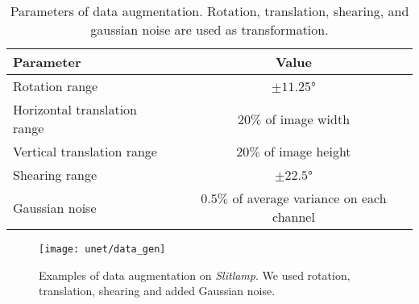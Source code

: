 \begin{table}[!htbp]
   \centering
   \caption[Data augmentation parameters]{Parameters of data augmentation. Rotation, translation, shearing, and gaussian noise are used as transformation.}
   \begin{tabular}{l|c}
      \toprule
      \textbf{Parameter} & \textbf{Value} \\
      \midrule
      Rotation range & $\pm11.25$° \\
      \midrule
      Horizontal translation range & $20\%$ of image width \\
      \midrule
      Vertical translation range & $20\%$ of image height \\
      \midrule
      Shearing range & $\pm22.5$° \\
      \midrule
     Gaussian noise & $0.5\%$ of average variance on each channel\\
      \bottomrule
   \end{tabular}
   \label{tab:data_gen_param}
\end{table}
\vspace{30pt}

\begin{figure}[!htbp]
  \centering
  \texttt{[image: unet/data\_gen]}
  \caption[Examples of data generator]{Examples of data augmentation on \textit{Slitlamp}. We used rotation, translation, shearing and added Gaussian noise.}
  \label{fig:data_gen}
\end{figure}

